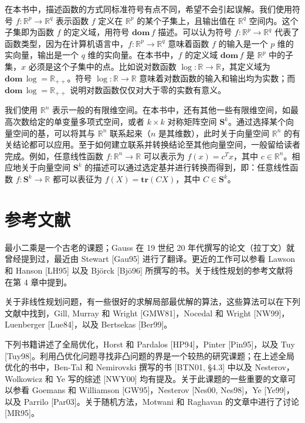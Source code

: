 \documentclass[UTF8, 12pt, fontset=fandol, oneside]{ctexart}
\begin{document}
在本书中，描述函数的方式同标准符号有点不同，希望不会引起误解。我们使用符号 $f:\mathbb{R}^p\to\mathbb{R}^q$ 表示函数 $f$ 定义在 $\mathbb{R}^p$ 的某个子集上，且输出值在 $\mathbb{R}^q$ 空间内。这个子集即为函数 $f$ 的定义域，用符号 $\mathbf{dom}\,f$ 描述。可以认为符号 $f:\mathbb{R}^p\to\mathbb{R}^q$ 代表了函数类型，因为在计算机语言中，$f:\mathbb{R}^p\to\mathbb{R}^q$ 意味着函数 $f$ 的输入是一个 $p$ 维的实向量，输出是一个 $q$ 维的实向量。在本书中，$f$ 的定义域 $\mathbf{dom}\,f$ 是 $\mathbb{R}^p$ 中的子集，$x$ 必须是这个子集中的点。比如说对数函数 $\log:\mathbb{R}\to\mathbb{R}$，其定义域为 $\mathbf{dom}\,\log=\mathbb{R}_{++}$。符号 $\log:\mathbb{R}\to\mathbb{R}$ 意味着对数函数的输入和输出均为实数；而 $\mathbf{dom}\,\log=\mathbb{R}_{++}$ 说明对数函数仅仅对大于零的实数有意义。

我们使用 $\mathbb{R}^n$ 表示一般的有限维空间。在本书中，还有其他一些有限维空间，如最高次数给定的单变量多项式空间，或者 $k\times k$ 对称矩阵空间 $\mathbf{S}^k$。通过选择某个向量空间的基，可以将其与 $\mathbb{R}^n$ 联系起来（$n$ 是其维数），此时关于向量空间 $\mathbb{R}^n$ 的有关结论都可以应用。至于如何建立联系并转换结论至其他向量空间，一般留给读者完成。例如，任意线性函数 $f:\mathbb{R}^n\to\mathbb{R}$ 可以表示为 $f(x)=c^Tx$，其中 $c\in\mathbb{R}^n$。相应地关于向量空间 $\mathbf{S}^k$ 的描述可以通过选定基并进行转换而得到，即：任意线性函数 $f:\mathbf{S}^k\to\mathbb{R}$ 都可以表征为 $f(X)=\mathbf{tr}(CX)$，其中 $C\in\mathbf{S}^k$。

\section*{参考文献}

最小二乘是一个古老的课题；Gauss 在 19 世纪 20 年代撰写的论文（拉丁文）就曾经提到过，最近由 Stewart [Gau95] 进行了翻译。更近的工作可以参看 Lawson 和 Hanson [LH95] 以及 Björck [Bjö96] 所撰写的书。关于线性规划的参考文献将在第 4 章中提到。

关于非线性规划问题，有一些很好的求解局部最优解的算法，这些算法可以在下列文献中找到，Gill, Murray 和 Wright [GMW81]，Nocedal 和 Wright [NW99]，Luenberger [Lue84]，以及 Bertsekas [Ber99]。

下列书籍讲述了全局优化，Horst 和 Pardalos [HP94]，Pinter [Pin95]，以及 Tuy [Tuy98]。利用凸优化问题寻找非凸问题的界是一个较热的研究课题；在上述全局优化的书中，Ben-Tal 和 Nemirovski 撰写的书 [BTN01, §4.3] 中以及 Nesterov，Wolkowicz 和 Ye 写的综述 [NWY00] 均有提及。关于此课题的一些重要的文章可以参看 Goemans 和 Williamson [GW95]，Nesterov [Nes00, Nes98]，Ye [Ye99]，以及 Parrilo [Par03]。关于随机方法，Motwani 和 Raghavan 的文章中进行了讨论 [MR95]。
\end{document}
